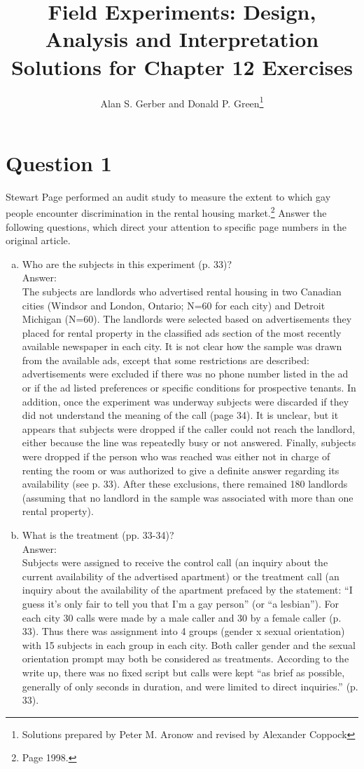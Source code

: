 \documentclass[11pt,notitlepage]{article}\usepackage[]{graphicx}\usepackage[]{color}
\title{Field Experiments: Design, Analysis and Interpretation \\
Solutions for Chapter 12 Exercises}
\author{Alan S. Gerber and Donald P. Green\footnote{Solutions prepared by Peter M. Aronow and revised by Alexander Coppock}}
\date{\vspace{-5ex}}
\begin{document}
\maketitle


\section*{Question 1}
Stewart Page performed an audit study to measure the extent to which gay people encounter discrimination in the rental housing market.\footnote{Page 1998.} Answer the following questions, which direct your attention to specific page numbers in the original article.

\begin{enumerate}[a)]
\item Who are the subjects in this experiment (p. 33)?\\
Answer:\\
The subjects are landlords who advertised rental housing in two Canadian cities (Windsor and London, Ontario; N=60 for each city) and Detroit Michigan (N=60). The landlords were selected based on advertisements they placed for rental property in the classified ads section of the most recently available newspaper in each city. It is not clear how the sample was drawn from the available ads, except that some restrictions are described: advertisements were excluded if there was no phone number listed in the ad or if the ad listed preferences or specific conditions for prospective tenants. In addition, once the experiment was underway subjects were discarded if they did not understand the meaning of the call (page 34). It is unclear, but it appears that subjects were dropped if the caller could not reach the landlord, either because the line was repeatedly busy or not answered. Finally, subjects were dropped if the person who was reached was either not in charge of renting the room or was authorized to give a definite answer regarding its availability (see p. 33). After these exclusions, there remained 180 landlords (assuming that no landlord in the sample was associated with more than one rental property). 

\item What is the treatment (pp. 33-34)?\\
Answer:\\
Subjects were assigned to receive the control call (an inquiry about the current availability of the advertised apartment) or the treatment call (an inquiry about the availability of the apartment prefaced by the statement: ``I guess it's only fair to tell you that I'm a gay person'' (or ``a lesbian''). For each city 30 calls were made by a male caller and 30 by a female caller (p. 33). Thus there was assignment into 4 groups (gender x sexual orientation) with 15 subjects in each group in each city. Both caller gender and the sexual orientation prompt may both be considered as treatments. According to the write up, there was no fixed script but calls were kept ``as brief as possible, generally of only seconds in duration, and were limited to direct inquiries.'' (p. 33).   


\end{enumerate}
\end{document}
